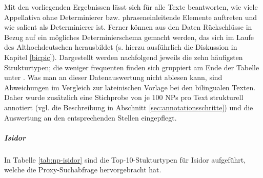 Mit den vorliegenden Ergebnissen lässt sich für alle Texte beantworten, wie viele Appellativa ohne Determinierer bzw. phraseneinleitende Elemente auftreten und wie salient  als Determinierer ist. Ferner können aus den Daten Rückschlüsse in Bezug auf ein mögliches  Determinierschema gemacht werden, das sich im Laufe des Althochdeutschen herausbildet (s. hierzu ausführlich die Diskussion in Kapitel \ref{bicpic}). Dargestellt werden nachfolgend jeweils die zehn häufigsten Strukturtypen; die weniger frequenten finden sich gruppiert am Ende der Tabelle unter .  Was man an dieser Datenauswertung  nicht ablesen kann, sind  Abweichungen im Vergleich zur lateinischen Vorlage bei den bilingualen Texten. Daher wurde zusätzlich eine Stichprobe von je 100 NPs pro Text strukturell annotiert (vgl. die Beschreibung in Abschnitt \ref{sec:annotationsschritte}) und die Auswertung an den entsprechenden Stellen eingepflegt.


\subparagraph*{Isidor}

In Tabelle \ref{tab:np-isidor} sind die Top-10-Stukturtypen für Isidor aufgeführt, welche die Proxy-Suchabfrage hervorgebracht hat. 


